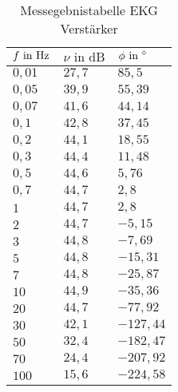 \begin{table}[]
\centering
\caption{Messegebnistabelle EKG Verstärker}
\label{tab:ergTable_ekg}
\begin{tabular}{|l|l|l|}
\hline
\rowcolor[HTML]{C0C0C0} 
$f\text{ in }\text{Hz}     $&$ \nu \text{ in dB}    $&$ \phi \text{ in } ^\circ    $\\ \hline
$0,01 $&$ 27,7 $&$ 85,5    $\\ \hline
$0,05 $&$ 39,9 $&$ 55,39   $\\ \hline
$0,07 $&$ 41,6 $&$ 44,14   $\\ \hline
$0,1   $&$ 42,8 $&$ 37,45   $\\ \hline
$0,2   $&$ 44,1 $&$ 18,55   $\\ \hline
$0,3   $&$ 44,4 $&$ 11,48   $\\ \hline
$0,5   $&$ 44,6 $&$ 5,76    $\\ \hline
$0,7   $&$ 44,7 $&$ 2,8     $\\ \hline
$1     $&$ 44,7 $&$ 2,8     $\\ \hline
$2     $&$ 44,7 $&$ -5,15   $\\ \hline
$3     $&$ 44,8 $&$ -7,69   $\\ \hline
$5     $&$ 44,8 $&$ -15,31  $\\ \hline
$7     $&$ 44,8 $&$ -25,87  $\\ \hline
$10    $&$ 44,9 $&$ -35,36  $\\ \hline
$20    $&$ 44,7 $&$ -77,92  $\\ \hline
$30    $&$ 42,1 $&$ -127,44 $\\ \hline
$50    $&$ 32,4 $&$ -182,47 $\\ \hline
$70    $&$ 24,4 $&$ -207,92 $\\ \hline
$100   $&$ 15,6 $&$ -224,58 $\\ \hline
\end{tabular}
\end{table}